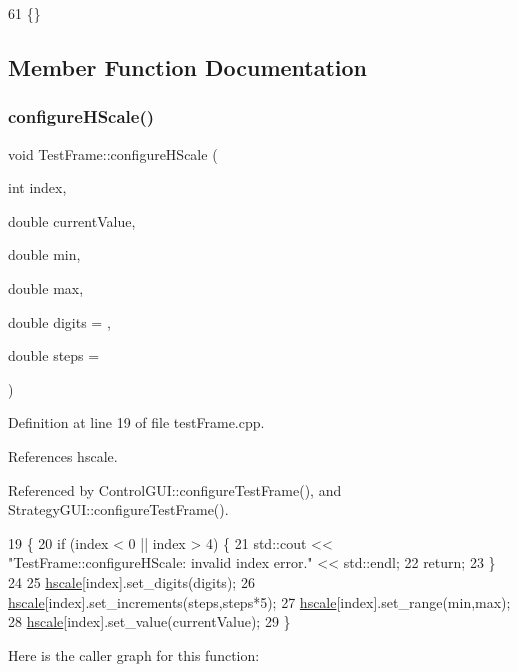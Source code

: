 \begin{DoxyCode}
61 \{\}
\end{DoxyCode}


\subsection{Member Function Documentation}
\mbox{\label{class_test_frame_a11a2d806abe566abbc431bff4b43ab79}} 
\subsubsection{\texorpdfstring{configure\+H\+Scale()}{configureHScale()}}
{\footnotesize\ttfamily void Test\+Frame\+::configure\+H\+Scale (\begin{DoxyParamCaption}\item[{int}]{index,  }\item[{double}]{current\+Value,  }\item[{double}]{min,  }\item[{double}]{max,  }\item[{double}]{digits = {},  }\item[{double}]{steps = {} }\end{DoxyParamCaption})}



Definition at line 19 of file test\+Frame.\+cpp.



References hscale.



Referenced by Control\+G\+U\+I\+::configure\+Test\+Frame(), and Strategy\+G\+U\+I\+::configure\+Test\+Frame().


\begin{DoxyCode}
19                                                                                                            
              \{
20     \textcolor{keywordflow}{if} (index < 0 || index > 4) \{
21       std::cout << \textcolor{stringliteral}{"TestFrame::configureHScale: invalid index error."} << std::endl;
22         \textcolor{keywordflow}{return};
23     \}
24 
25     \hyperlink{class_test_frame_ac85dadacc49bc00afc3df6c60635c1e3}{hscale}[index].set\_digits(digits);
26     \hyperlink{class_test_frame_ac85dadacc49bc00afc3df6c60635c1e3}{hscale}[index].set\_increments(steps,steps*5);
27     \hyperlink{class_test_frame_ac85dadacc49bc00afc3df6c60635c1e3}{hscale}[index].set\_range(min,max);
28     \hyperlink{class_test_frame_ac85dadacc49bc00afc3df6c60635c1e3}{hscale}[index].set\_value(currentValue);
29 \}
\end{DoxyCode}
Here is the caller graph for this function\+:
\mbox{\label{class_test_frame_aeb75046b3b4be4c4dbc43d233e967a08}} 
